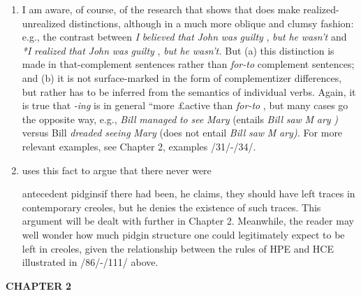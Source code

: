 \begin{enumerate}
\item I am aware, of course, of the research that shows that  
does make realized-unrealized distinctions, although in a much more oblique and clumsy fashion: e.g., the contrast between \textit{I} \textit{believed} \textit{that} \textit{John} \textit{was} \textit{guilty} , \textit{but} \textit{he} \textit{wasn't} and \textit{*I} \textit{realized} \textit{that} \textit{John} \textit{was} \textit{guilty} , \textit{but} \textit{he} \textit{wasn't.} But (a) this distinction is made in that-complement sentences rather than \textit{for-to} complement sentences; and (b) it is not surface-marked in the form of complementizer differences, but rather has to be inferred from the semantics of individual verbs. Again, it is true that \textit{{}-i}\textit{n}\textit{g}  is in general ``more £active than \textit{for-to} , but many cases go the opposite way, e.g., \textit{Bill} \textit{managed} \textit{to} \textit{see} \textit{Mary} (entails \textit{Bill} \textit{saw} \textit{M} \textit{ary} \textit{)} versus Bill \textit{dreaded} \textit{seeing} \textit{Mary} (does not entail \textit{Bill} \textit{saw} \textit{M} \textit{ary).} For more relevant exam\-ples, see Chapter 2, examples /31/-/34/.
 
\item \citet{Alleyne1979} uses this fact to argue that there never were 

antecedent pidginsif there had been, he claims, they should have left traces in contemporary creoles, but he denies the existence of such traces. This argument will be dealt with further in Chapter 2. Meanwhile, the reader may well wonder how much pidgin structure one could legitimately expect to be left in creoles, given the relation\-ship between the rules of HPE and HCE illustrated in /86/-/111/ above.

\end{enumerate}

\textbf{CHAPTER} \textbf{2}


